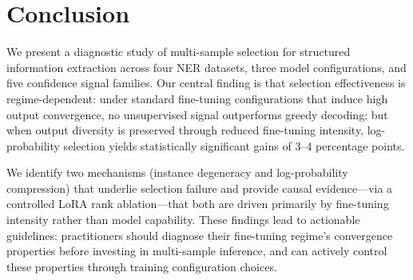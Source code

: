 \documentclass[11pt,a4paper]{article}
\begin{document}
\section{Conclusion}

We present a diagnostic study of multi-sample selection for structured information extraction across four NER datasets, three model configurations, and five confidence signal families.
Our central finding is that selection effectiveness is regime-dependent: under standard fine-tuning configurations that induce high output convergence, no unsupervised signal outperforms greedy decoding; but when output diversity is preserved through reduced fine-tuning intensity, log-probability selection yields statistically significant gains of 3--4 percentage points.

We identify two mechanisms (instance degeneracy and log-probability compression) that underlie selection failure and provide causal evidence---via a controlled LoRA rank ablation---that both are driven primarily by fine-tuning intensity rather than model capability.
These findings lead to actionable guidelines: practitioners should diagnose their fine-tuning regime's convergence properties before investing in multi-sample inference, and can actively control these properties through training configuration choices.
\end{document}
